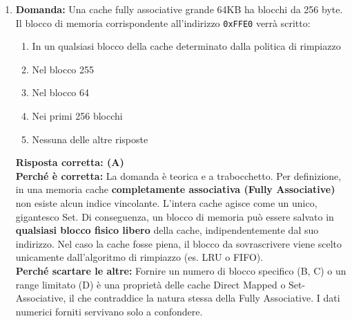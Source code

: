 \documentclass[12pt, a4paper]{article}
\begin{document}
\begin{enumerate}
    \item \textbf{Domanda:} Una cache fully associative grande 64KB ha blocchi da 256 byte. Il blocco di memoria corrispondente all'indirizzo \texttt{0xFFE0} verrà scritto:
    \begin{enumerate}[label=(\Alph*)]
        \item In un qualsiasi blocco della cache determinato dalla politica di rimpiazzo
        \item Nel blocco 255
        \item Nel blocco 64
        \item Nei primi 256 blocchi
        \item Nessuna delle altre risposte
    \end{enumerate}
    \textbf{Risposta corretta: (A)} \\
    \textbf{Perché è corretta:} La domanda è teorica e a trabocchetto. Per definizione, in una memoria cache \textbf{completamente associativa (Fully Associative)} non esiste alcun indice vincolante. L'intera cache agisce come un unico, gigantesco Set. Di conseguenza, un blocco di memoria può essere salvato in \textbf{qualsiasi blocco fisico libero} della cache, indipendentemente dal suo indirizzo. Nel caso la cache fosse piena, il blocco da sovrascrivere viene scelto unicamente dall'algoritmo di rimpiazzo (es. LRU o FIFO). \\
    \textbf{Perché scartare le altre:} Fornire un numero di blocco specifico (B, C) o un range limitato (D) è una proprietà delle cache Direct Mapped o Set-Associative, il che contraddice la natura stessa della Fully Associative. I dati numerici forniti servivano solo a confondere.


\end{enumerate}
\end{document}
